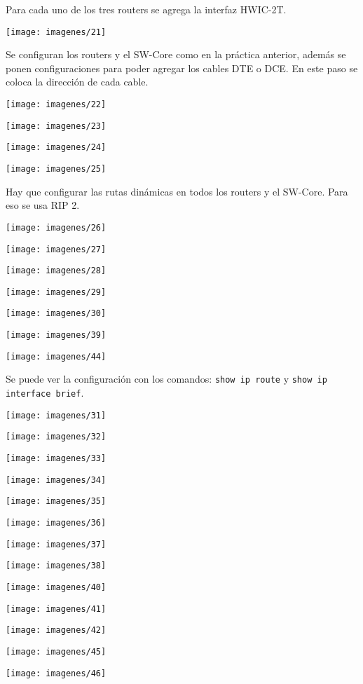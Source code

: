 \documentclass{article}
\begin{document}
Para cada uno de los tres routers se agrega la interfaz HWIC-2T.

\begin{center}
\texttt{[image: imagenes/21]}
\end{center}

Se configuran los routers y el SW-Core como en la práctica anterior, además se ponen configuraciones para poder agregar los cables DTE o DCE. En este paso se coloca la dirección de cada cable.

\begin{center}
\texttt{[image: imagenes/22]}

\texttt{[image: imagenes/23]}

\texttt{[image: imagenes/24]}

\texttt{[image: imagenes/25]}
\end{center}

Hay que configurar las rutas dinámicas en todos los routers y el SW-Core. Para eso se usa RIP 2.

\begin{center}
\texttt{[image: imagenes/26]}

\texttt{[image: imagenes/27]}

\texttt{[image: imagenes/28]}

\texttt{[image: imagenes/29]}

\texttt{[image: imagenes/30]}

\texttt{[image: imagenes/39]}

\texttt{[image: imagenes/44]}
\end{center}

Se puede ver la configuración con los comandos: \texttt{show ip route} y \texttt{show ip interface brief}.

\begin{center}
\texttt{[image: imagenes/31]}

\texttt{[image: imagenes/32]}

\texttt{[image: imagenes/33]}

\texttt{[image: imagenes/34]}

\texttt{[image: imagenes/35]}

\texttt{[image: imagenes/36]}

\texttt{[image: imagenes/37]}

\texttt{[image: imagenes/38]}

\texttt{[image: imagenes/40]}

\texttt{[image: imagenes/41]}

\texttt{[image: imagenes/42]}

\texttt{[image: imagenes/45]}

\texttt{[image: imagenes/46]}
\end{center}
\end{document}
